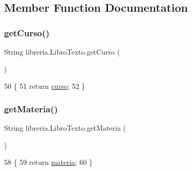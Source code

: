 \subsection{Member Function Documentation}
\mbox{\label{classlibreria_1_1_libro_texto_aec98a4d380dabb50785ce438c59db960}} 
\subsubsection{\texorpdfstring{get\+Curso()}{getCurso()}}
{\footnotesize\ttfamily String libreria.\+Libro\+Texto.\+get\+Curso (\begin{DoxyParamCaption}{ }\end{DoxyParamCaption})\hspace{0.3cm}{\ttfamily [inline]}}


\begin{DoxyCode}
50                              \{
51         \textcolor{keywordflow}{return} \mbox{\hyperlink{classlibreria_1_1_libro_texto_a8ca1aa8329b1cc51b986d7826c25ee10}{curso}};
52     \}
\end{DoxyCode}
\mbox{\label{classlibreria_1_1_libro_texto_ac6c7e83dbd84661162346e6261e8e017}} 
\subsubsection{\texorpdfstring{get\+Materia()}{getMateria()}}
{\footnotesize\ttfamily String libreria.\+Libro\+Texto.\+get\+Materia (\begin{DoxyParamCaption}{ }\end{DoxyParamCaption})\hspace{0.3cm}{\ttfamily [inline]}}


\begin{DoxyCode}
58                                \{
59         \textcolor{keywordflow}{return} \mbox{\hyperlink{classlibreria_1_1_libro_texto_aed34f3bc7feec9962c4877156fb6ae0c}{materia}};
60     \}
\end{DoxyCode}
\mbox{\label{classlibreria_1_1_libro_texto_ac4a2e8c5364c4cd68b0cd9591c0ac079}} 
